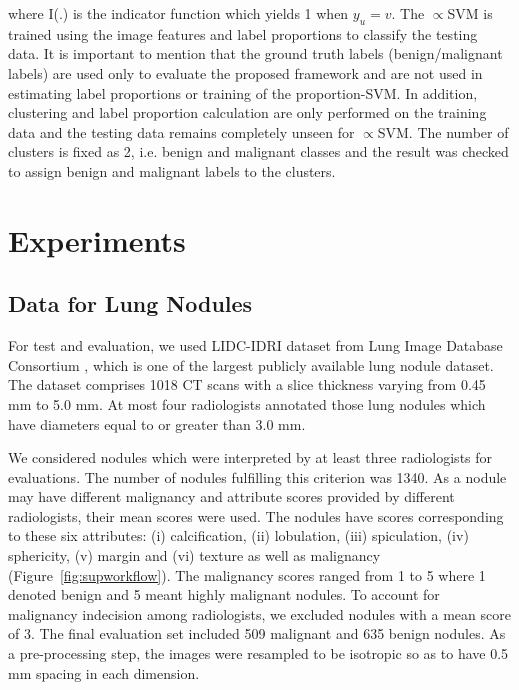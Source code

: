 \documentclass[journal]{IEEEtran}
\begin{document}
\noindent where I(.) is the indicator function which yields 1 when $y_u=v$. The $\propto$SVM is trained using the image features and label proportions to classify the testing data. It is important to mention that the ground truth labels (benign/malignant labels) are used only to evaluate the proposed framework and are not used in estimating label proportions or training of the proportion-SVM. In addition, clustering and label proportion calculation are only performed on the training data and the testing data remains completely unseen for $\propto$SVM. The number of clusters is fixed as 2, i.e. benign and malignant classes and the result was checked to assign benign and malignant labels to the clusters.
 
\section{Experiments}

\subsection{Data for Lung Nodules}
For test and evaluation, we used LIDC-IDRI dataset from Lung Image Database Consortium \cite{armato2011lung}, which is one of the largest publicly available lung nodule dataset. The dataset comprises 1018 CT scans with a slice thickness varying from 0.45 mm to 5.0 mm. At most four radiologists annotated those lung nodules which have diameters equal to or greater than 3.0 mm.

We considered nodules which were interpreted by at least three radiologists for evaluations. The number of nodules fulfilling this criterion was 1340. As a nodule may have different malignancy and attribute scores provided by different radiologists, their mean scores were used. The nodules have scores corresponding to these six attributes: (i) calcification, (ii) lobulation, (iii) spiculation, (iv) sphericity, (v) margin and (vi) texture as well as malignancy (Figure~\ref{fig:supworkflow}). The malignancy scores ranged from 1 to 5 where 1 denoted benign and 5 meant highly malignant nodules. To account for malignancy indecision among radiologists, we excluded nodules with a mean score of 3. The final evaluation set included 509 malignant and 635 benign nodules. As a pre-processing step, the images were resampled to be isotropic so as to have 0.5 mm spacing in each dimension.
\end{document}
